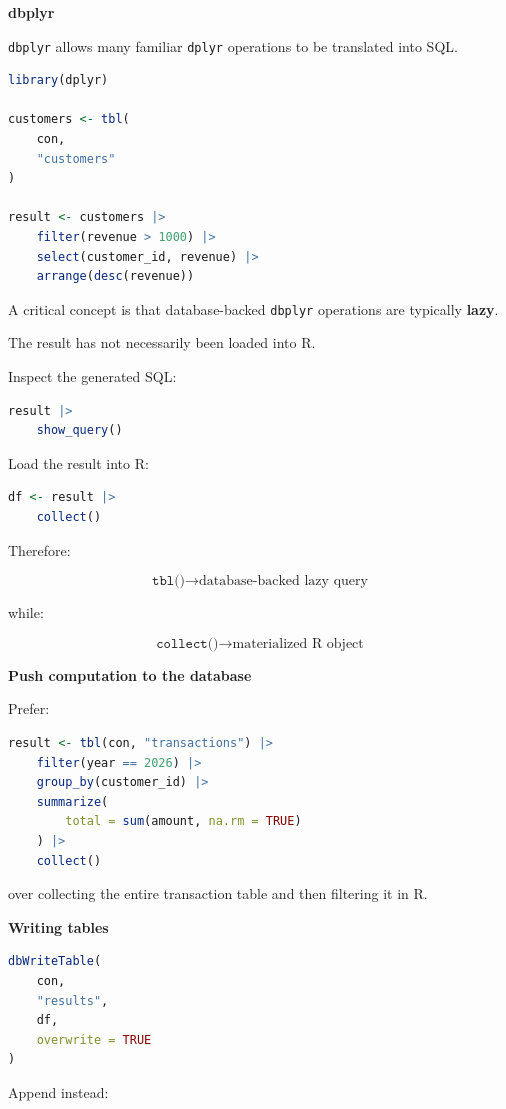 \documentclass[11pt,letterpaper]{article}
\begin{document}
\textbf{dbplyr}

\texttt{dbplyr} allows many familiar \texttt{dplyr} operations to be
translated into SQL.

\begin{lstlisting}[language=R]
library(dplyr)

customers <- tbl(
    con,
    "customers"
)

result <- customers |>
    filter(revenue > 1000) |>
    select(customer_id, revenue) |>
    arrange(desc(revenue))
\end{lstlisting}

A critical concept is that database-backed \texttt{dbplyr} operations are
typically \textbf{lazy}.

The result has not necessarily been loaded into R.

Inspect the generated SQL:

\begin{lstlisting}[language=R]
result |>
    show_query()
\end{lstlisting}

Load the result into R:

\begin{lstlisting}[language=R]
df <- result |>
    collect()
\end{lstlisting}

Therefore:

\[
\texttt{tbl()}
\rightarrow
\text{database-backed lazy query}
\]

while:

\[
\texttt{collect()}
\rightarrow
\text{materialized R object}
\]

\textbf{Push computation to the database}

Prefer:

\begin{lstlisting}[language=R]
result <- tbl(con, "transactions") |>
    filter(year == 2026) |>
    group_by(customer_id) |>
    summarize(
        total = sum(amount, na.rm = TRUE)
    ) |>
    collect()
\end{lstlisting}

over collecting the entire transaction table and then filtering it in R.

\textbf{Writing tables}

\begin{lstlisting}[language=R]
dbWriteTable(
    con,
    "results",
    df,
    overwrite = TRUE
)
\end{lstlisting}

Append instead:
\end{document}
